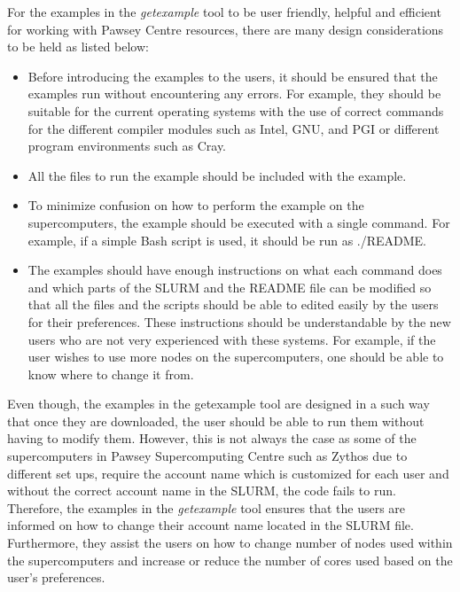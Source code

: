For the examples in the \emph{getexample} tool to be user friendly, helpful and efficient for working with Pawsey Centre resources, there are many design 
considerations to be held as listed below:

\begin{itemize}
\item Before introducing the examples to the users, it should be ensured that the examples run without encountering any errors. For example,
they should be suitable for the current operating systems with the use of correct commands for the different compiler modules such as Intel, GNU,
and PGI or different program environments such as Cray.
\item All the files to run the example should be included with the example.
\item To minimize confusion on how to perform the example on the supercomputers, the example should be executed with a single command. For example, 
if a simple Bash script is used, it should be run as ./README.
\item The examples should have enough instructions on what each command does and which parts of the SLURM and the README file can be modified so that
all the files and the scripts should be able to edited easily by the users for their preferences. These instructions should be understandable by the new 
users who are not very experienced with these systems. For example, if the user wishes to use more nodes on the supercomputers, one should be able to 
know where to change it from.
\end{itemize}
 
Even though, the examples in the getexample tool are designed in a such way that once they are downloaded, the user should be able to run them without
having to modify them. However, this is not always the case as some of the supercomputers in Pawsey Supercomputing Centre such as Zythos due to
different set ups, require the account name which is customized for each user and without the correct account name in the SLURM, the code fails to run. 
Therefore, the examples in the \emph{getexample} tool ensures that the users are informed on how to change their account name located in the SLURM file.
Furthermore, they assist the users on how to change number of nodes used within the supercomputers and increase or reduce the number of cores used
based on the user's preferences.

